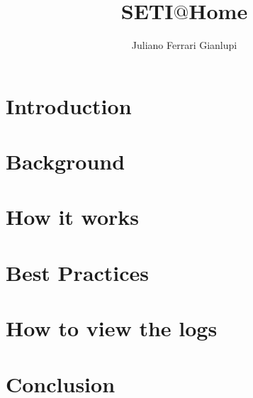 \title{SETI$@$Home}

\author{Juliano Ferrari Gianlupi}


\renewcommand{\shortauthors}{J. F. Gianlupi}


\begin{abstract}

\end{abstract}



\maketitle

\section{Introduction}

\section{Background}

\section{How it works}


\section{Best Practices}

\section{How to view the logs}

\section{Conclusion}

\begin{acks}

\end{acks}


 

